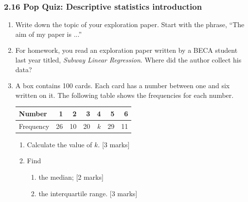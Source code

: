 \documentclass[12pt, twoside]{article}
\begin{document}
\subsubsection*{2.16 Pop Quiz: Descriptive statistics introduction}

\begin{enumerate}

  \item Write down the topic of your exploration paper. Start with the phrase, ``The aim of my paper is ...''  \vspace{3cm}
  
  \item For homework, you read an exploration paper written by a BECA student last year titled, \emph{Subway Linear Regression}. Where did the author collect his data?  \vspace{1cm}
  
  \item A box contains 100 cards. Each card has a number between one and six written on it. The following table shows the frequencies for each number.
  
  \begin{tabular}{|l|r|r|r|r|r|r|}
    \hline
    Number & 1 & 2 & 3 & 4 & 5 & 6\\ 
    \hline 
    Frequency & 26 & 10 & 20 & $k$ & 29 & 11\\ 
    \hline 
    \end{tabular}

  \begin{enumerate}
    \item Calculate the value of $k$. \hfill [3 marks] \vspace{3cm}
    \item Find
    \begin{enumerate}
      \item the median; \hfill [2 marks] \vspace{3cm}
      \item the interquartile range. \hfill [3 marks] \vspace{3cm}
    \end{enumerate}
  \end{enumerate}

\newpage


\end{enumerate}
\end{document}
